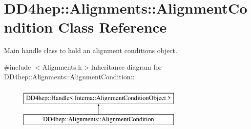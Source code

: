 \hypertarget{class_d_d4hep_1_1_alignments_1_1_alignment_condition}{
\section{DD4hep::Alignments::AlignmentCondition Class Reference}
\label{class_d_d4hep_1_1_alignments_1_1_alignment_condition}
}


Main handle class to hold an alignment conditions object.  


{\ttfamily \#include $<$Alignments.h$>$}Inheritance diagram for DD4hep::Alignments::AlignmentCondition::\begin{figure}[H]
\begin{center}
\leavevmode
\includegraphics[height=2cm]{class_d_d4hep_1_1_alignments_1_1_alignment_condition}
\end{center}
\end{figure}
